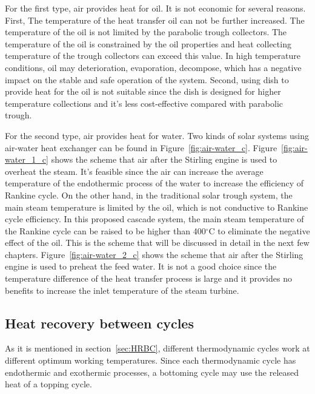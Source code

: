 For the first type, air provides heat for oil. It is not economic for several reasons. First, The temperature of the heat transfer oil can not be further increased. The temperature of the oil is not limited by the parabolic trough collectors. The temperature of the oil is constrained by the oil properties and heat collecting temperature of the trough collectors can exceed this value. In high temperature conditions, oil may deterioration, evaporation, decompose, which has a negative impact on the stable and safe operation of the system. Second, using dish to provide heat for the oil is not suitable since the dish is designed for higher temperature collections and it's less cost-effective compared with parabolic trough.

For the second type, air provides heat for water. Two kinds of solar systems using air-water heat exchanger can be found in Figure~\ref{fig:air-water_c}. Figure~\ref{fig:air-water_1_c} shows the scheme that air after the Stirling engine is used to overheat the steam. It's feasible since the air can increase the average temperature of the endothermic process of the water to increase the efficiency of Rankine cycle. On the other hand, in the traditional solar trough system, the main steam temperature is limited by the oil, which is not conductive to Rankine cycle efficiency. In this proposed cascade system, the main steam temperature of the Rankine cycle can be raised to be higher than 400$\mathrm{^\circ C}$ to eliminate the negative effect of the oil.
This is the scheme that will be discussed in detail in the next few chapters. Figure~\ref{fig:air-water_2_c} shows the scheme that air after the Stirling engine is used to preheat the feed water. It is not a good choice since the temperature difference of the heat transfer process is large and it provides no benefits to increase the inlet temperature of the steam turbine.
 
\subsection{Heat recovery between cycles}
As it is mentioned in section~\ref{sec:HRBC}, different thermodynamic cycles work at different optimum working temperatures. Since each thermodynamic cycle has endothermic and exothermic processes, a bottoming cycle may use the released heat of a topping cycle.

